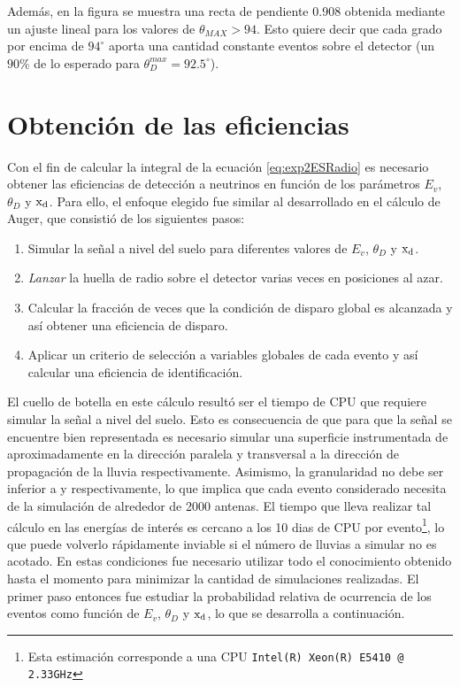	Adem\'as, en la figura se muestra una recta de pendiente 0.908 obtenida mediante un ajuste lineal para los valores de $\theta_{MAX}>94$.
	Esto quiere decir que cada grado por encima de $94^\circ$ aporta una cantidad constante eventos sobre el detector (un $90\%$ de lo esperado para $\theta_D^{max}=92.5^\circ$).
	
\section{Obtenci\'on de las eficiencias}
\label{sc:effRadio}

Con el fin de calcular la integral de la ecuaci\'on \ref{eq:exp2ESRadio} es necesario obtener las eficiencias de detecci\'on a neutrinos en funci\'on de los par\'ametros $E_v$, $\theta_D$ y ${\rm x_d}$. 
Para ello, el enfoque elegido fue similar al desarrollado en el c\'alculo de Auger, que consisti\'o de los siguientes pasos:
%
\begin{enumerate}
	\item Simular la se\~nal a nivel del suelo para diferentes valores de $E_v$, $\theta_D$ y ${\rm x_d}$.
	\item \emph{Lanzar} la huella de radio sobre el detector varias veces en posiciones al azar.
	\item Calcular la fracci\'on de veces que la condici\'on de disparo global es alcanzada y as\'i obtener una eficiencia de disparo.
	\item Aplicar un criterio de selecci\'on a variables globales de cada evento y as\'i calcular una eficiencia de identificaci\'on.
\end{enumerate}
%

El cuello de botella en este c\'alculo result\'o ser el tiempo de CPU que requiere simular la se\~nal a nivel del suelo.
Esto es consecuencia de que para que la se\~nal se encuentre bien representada es necesario simular una superficie instrumentada de aproximadamente  en la direcci\'on paralela y transversal a la direcci\'on de propagaci\'on de la lluvia respectivamente.
Asimismo, la granularidad no debe ser inferior a  y  respectivamente, lo que implica que cada evento considerado necesita de la simulaci\'on de alrededor de 2000 antenas.
El tiempo que lleva realizar tal c\'alculo en las energ\'ias de inter\'es es cercano a los 10 dias de CPU por evento\footnote{Esta estimaci\'on corresponde a una CPU \texttt{Intel(R) Xeon(R) E5410 @ 2.33GHz}}, lo que puede volverlo r\'apidamente inviable si el n\'umero de lluvias a simular no es acotado.
En estas condiciones fue necesario utilizar todo el conocimiento obtenido hasta el momento para minimizar la cantidad de simulaciones realizadas.
El primer paso entonces fue estudiar la probabilidad relativa de ocurrencia de los eventos como funci\'on de $E_v$, $\theta_D$ y ${\rm x_d}$, lo que se desarrolla a continuaci\'on.
	
